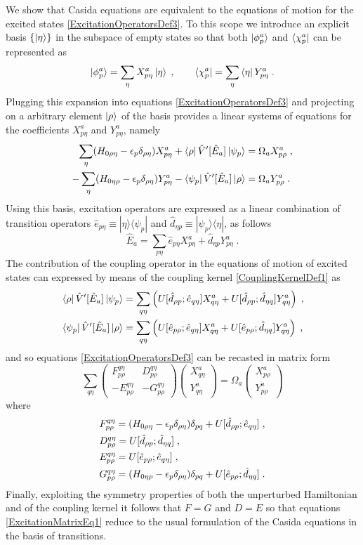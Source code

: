 \documentclass[reprint,aps,prb]{revtex4-1}
\newcommand{\eps}{\epsilon}
\newcommand{\be}{\begin{equation}}
\newcommand{\ee}{\end{equation}}
\newcommand{\nn}{\notag}
\newcommand{\qq}{\qquad}
\newcommand{\lb}{\label}
\newcommand{\mat}[1]{\begin{pmatrix} #1\end{pmatrix}}
\newcommand{\op}[1]{\hat {#1}}
\newcommand{\ketbra}[2]{| #1 \rangle \langle #2 |}
\newcommand{\excite}[2]{\op e_{{#1}{#2}}}
\newcommand{\decay}[2]{\op d_{{#1}{#2}}}
\begin{document}
We show that Casida equations are equivalent to the equations of motion for the excited states \eqref{ExcitationOperatorsDef3}. To this scope we introduce an explicit basis $\{\ket{\eta}\}$
in the subspace of empty states so that both $\ket{\phi^a_p}$ and $\bra{\chi^a_p}$ can be represented as
\be
\ket{\phi^a_p} = \sum_\eta X^a_{p\eta}\ket{\eta} \;, \qq
\bra{\chi^a_p} = \sum_\eta\bra{\eta}Y^a_{p\eta} \;.
\ee
Plugging this expansion into equations \eqref{ExcitationOperatorsDef3} and projecting on a arbitrary element $\ket{\rho}$ of the basis provides a linear systems of equations for the coefficients
$X^a_{p\eta}$ and $Y^a_{p\eta}$, namely
\begin{align}
 \sum_\eta(H_{0\rho\eta}-\eps_p\delta_{\rho\eta})X^a_{p\eta} + \bra{\rho}\op V'[\op E_a]\ket{\psi_p} &= \Omega_a X^a_{p\rho} \;, \nn \\
 -\sum_\eta (H_{0\eta\rho}-\eps_p\delta_{\rho\eta})Y^a_{p\eta} - \bra{\psi_p}\op V'[\op E_a]\ket{\rho}& = \Omega_a Y^a_{p\rho} \;. \nn
\end{align}
Using this basis, excitation operators are expressed as a linear combination of transition operators $\excite{p}{\eta} \equiv \ketbra{\eta}{\psi_p}$ and $\decay{\eta}{p} \equiv \ketbra{\psi_p}{\eta}$,
as follows
\be\lb{ExcitationOpBasisTransition1}
\op E_a = \sum_{p\eta}\excite{p}{\eta}X^a_{p\eta}+\decay{\eta}{p}Y^a_{p\eta} \;.
\ee
The contribution of the coupling operator in the equations of motion of excited states can expressed by means of the coupling kernel \eqref{CouplingKernelDef1} as
\begin{align}
& \bra{\rho}\op V'[\op E_a]\ket{\psi_p} = \sum_{q\eta}\left(U[\decay{\rho}{p};\excite{q}{\eta}]X^a_{q\eta} + U[\decay{\rho}{p};\decay{\eta}{q}]Y^a_{q\eta}\right) \;,\nn \\
& \bra{\psi_p}\op V'[\op E_a]\ket{\rho} = \sum_{q\eta}\left(U[\excite{p}{\rho};\excite{q}{\eta}]X^a_{q\eta} + U[\excite{p}{\rho};\decay{\eta}{q}]Y^a_{q\eta}\right) \;, \nn
\end{align}
and so equations \eqref{ExcitationOperatorsDef3} can be recasted in matrix form
\be\lb{ExcitationMatrixEq1}
\sum_{q\eta}\mat{F_{p\rho}^{q\eta} &  D_{p\rho}^{q\eta}  \\
- E_{p\rho}^{q\eta} & - G_{p\rho}^{q\eta} }
\mat{X^a_{q\eta} \\ Y^a_{q\eta}} = \Omega_a \mat{X^a_{p\rho} \\ Y^a_{p\rho}}
\ee
where
\begin{align}
& F_{p\rho}^{q\eta} = (H_{0\rho\eta}-\eps_p\delta_{\rho\eta})\delta_{pq} + U[\decay{\rho}{p};\excite{q}{\eta}] \;,\nn \\
& D_{p\rho}^{q\eta} = U[\decay{\rho}{p};\decay{\eta}{q}] \;,\nn \\
& E_{p\rho}^{q\eta} = U[\excite{p}{\rho};\excite{q}{\eta}] \;,\nn \\
& G_{p\rho}^{q\eta} = (H_{0\eta\rho}-\eps_p\delta_{\rho\eta})\delta_{pq} + U[\excite{p}{\rho};\decay{\eta}{q}] \;. \nn
\end{align}
Finally, exploiting the symmetry properties of both the unperturbed Hamiltonian and of the coupling kernel it follows that $F=G$ and $D=E$ so that equations
\eqref{ExcitationMatrixEq1} reduce to the usual formulation of the Casida equations in the basis of transitions. 
\end{document}
